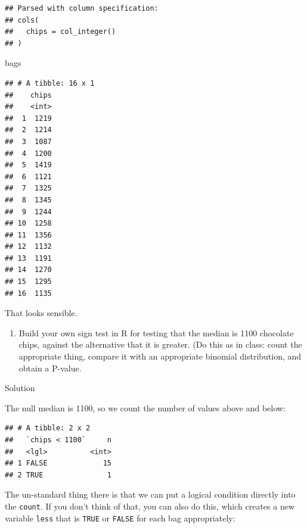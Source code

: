 \documentclass[]{tufte-book}
\newenvironment{Shaded}{}{}
\newcommand{\DecValTok}[1]{\textcolor[rgb]{0.25,0.63,0.44}{#1}}
\newcommand{\KeywordTok}[1]{\textcolor[rgb]{0.00,0.44,0.13}{\textbf{#1}}}
\newcommand{\NormalTok}[1]{#1}
\newcommand{\OperatorTok}[1]{\textcolor[rgb]{0.40,0.40,0.40}{#1}}
\newcommand{\StringTok}[1]{\textcolor[rgb]{0.25,0.44,0.63}{#1}}
\providecommand{\tightlist}{%
  \setlength{\itemsep}{0pt}\setlength{\parskip}{0pt}}
\theoremstyle{definition}
\theoremstyle{definition}
\theoremstyle{definition}
\theoremstyle{remark}
\begin{document}
\begin{verbatim}
## Parsed with column specification:
## cols(
##   chips = col_integer()
## )
\end{verbatim}

\begin{Shaded}
\begin{Highlighting}[]
\NormalTok{bags}
\end{Highlighting}
\end{Shaded}

\begin{verbatim}
## # A tibble: 16 x 1
##    chips
##    <int>
##  1  1219
##  2  1214
##  3  1087
##  4  1200
##  5  1419
##  6  1121
##  7  1325
##  8  1345
##  9  1244
## 10  1258
## 11  1356
## 12  1132
## 13  1191
## 14  1270
## 15  1295
## 16  1135
\end{verbatim}

That looks sensible.

\begin{enumerate}
\def\labelenumi{(\alph{enumi})}
\setcounter{enumi}{1}
\tightlist
\item
  Build your own sign test in R for testing that the median is 1100
  chocolate chips, against the alternative that it is greater. (Do this
  as in class: count the appropriate thing, compare it with an
  appropriate binomial distribution, and obtain a P-value.
\end{enumerate}

Solution

The null median is 1100, so we count the number of values above and
below:

\begin{Shaded}
\end{Shaded}

\begin{verbatim}
## # A tibble: 2 x 2
##   `chips < 1100`     n
##   <lgl>          <int>
## 1 FALSE             15
## 2 TRUE               1
\end{verbatim}

The un-standard thing there is that we can put a logical condition
directly into the \texttt{count}. If you don't think of that, you can
also do this, which creates a new variable \texttt{less} that is
\texttt{TRUE} or \texttt{FALSE} for each bag appropriately:
\end{document}
